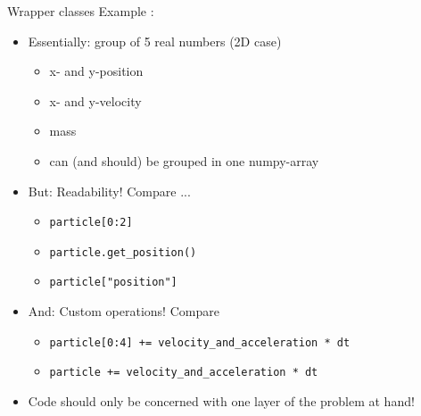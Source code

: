 \begin{frame}{Wrapper classes}
%
Example :
\begin{itemize}
\item Essentially: group of 5 real numbers (2D case)
	\begin{itemize}
	\item x- and y-position
	\item x- and y-velocity
	\item mass
	\item[\Thus] can (and should) be grouped in one numpy-array
	\end{itemize}
\item But: Readability! Compare ...
	\begin{itemize}
	\item \texttt{particle[0:2]}
	\item \texttt{particle.get\_position()}
	\item \texttt{particle["position"]}
	\end{itemize}
\item And: Custom operations! Compare
	\begin{itemize}
	\item \texttt{particle[0:4] += velocity\_and\_acceleration * dt}
	\item \texttt{particle += velocity\_and\_acceleration * dt}
	\end{itemize}
\item[\Thus] Code should only be concerned with one layer of the problem at hand!
\end{itemize}
%
\end{frame}


